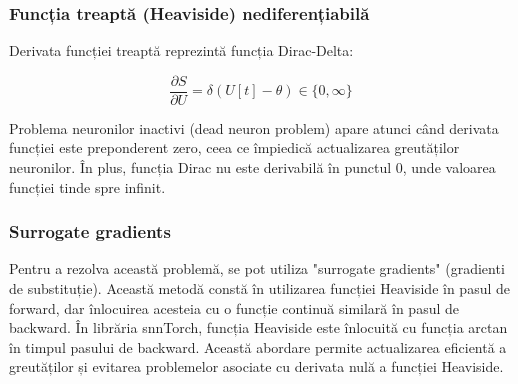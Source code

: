 \subsubsection{Funcția treaptă (Heaviside) nediferențiabilă}

Derivata funcției treaptă reprezintă funcția Dirac-Delta:

\begin{equation}
\label{eq:diracFunction}
\frac{\partial S}{\partial U} = \delta(U[t] - \theta) \in \{0, \infty\}
\end{equation}

Problema neuronilor inactivi (dead neuron problem) apare atunci când derivata funcției este preponderent zero, ceea ce împiedică actualizarea greutăților neuronilor. În plus, funcția Dirac nu este derivabilă în punctul 0, unde valoarea funcției tinde spre infinit.

\subsubsection{Surrogate gradients}

Pentru a rezolva această problemă, se pot utiliza "surrogate gradients" (gradienti de substituție). Această metodă constă în utilizarea funcției Heaviside în pasul de forward, dar înlocuirea acesteia cu o funcție continuă similară în pasul de backward. În librăria snnTorch, funcția Heaviside este înlocuită cu funcția arctan în timpul pasului de backward. Această abordare permite actualizarea eficientă a greutăților și evitarea problemelor asociate cu derivata nulă a funcției Heaviside.